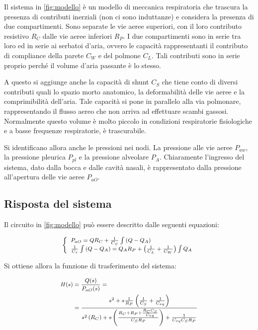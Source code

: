 Il sistema in \cref{fig:modello} è un modello di meccanica respiratoria che trascura la presenza di contributi inerziali (non ci sono induttanze) e considera la presenza di due compartimenti. Sono separate le vie aeree superiori, con il loro contributo resistivo $R_C$ dalle vie aeree inferiori $R_P$. I due compartimenti sono in serie tra loro ed in serie ai serbatoi d'aria, ovvero le capacità rappresentanti il contributo di compliance della parete $C_W$ e del polmone $C_L$. 
Tali contributi sono in serie proprio perché il volume d'aria passante è lo stesso. 

A questo si aggiunge anche la capacità di shunt $C_S$ che tiene conto di diversi contributi quali lo spazio morto anatomico, la deformabilità delle vie aeree e la comprimibilità dell'aria. Tale capacità si pone in parallelo alla via polmonare, rappresentando il flusso aereo che non arriva ad effettuare scambi gassosi. Normalmente questo volume è molto piccolo in condizioni respiratorie fisiologiche e a basse frequenze respiratorie, è trascurabile.

Si identificano allora anche le pressioni nei nodi. La pressione alle vie aeree $P_{aw}$, la pressione pleurica $P_{pl}$ e la pressione alveolare $P_A$. Chiaramente l'ingresso del sistema, dato dalla bocca e dalle cavità nasali, è rappresentato dalla pressione all'apertura delle vie aeree $P_{aO}$. 



\subsection{Risposta del sistema}

Il circuito in \cref{fig:modello} può essere descritto dalle seguenti equazioni:

\begin{equation}
	\footnotesize{
	\left\{\begin{array}{l}
		P_{a O}=Q R_{C}+\frac{1}{C_{S}} \int\left(Q-Q_{A}\right) \\
		\frac{1}{C_{s}} \int\left(Q-Q_{A}\right)=Q_{A} R_{P}+\left(\frac{1}{C_{L}}+\frac{1}{C_{W}}\right) \int Q_{A}
	\end{array}\right.}
\label{eq:modello}
\end{equation}

Si ottiene allora la funzione di trasferimento del sistema:

\begin{equation}
		\footnotesize{
\begin{aligned}
	H(s)&=\frac{Q(s)}{P_{a O}(s)}=\\
	&=\frac{s^{2}+s \frac{1}{R_{P}}\left(\frac{1}{C_{S}}+\frac{1}{C_{e q}}\right)}{s^{2}\left(R_{C}\right)+s\left(\frac{R_{C}+R_{P}+\frac{R_{C} C_{S}}{C_{e q}}}{C_{S} R_{P}}\right)+\frac{1}{C_{e q} C_{S} R_{P}}}
\end{aligned}}
\label{eq:fdt}
\end{equation}

